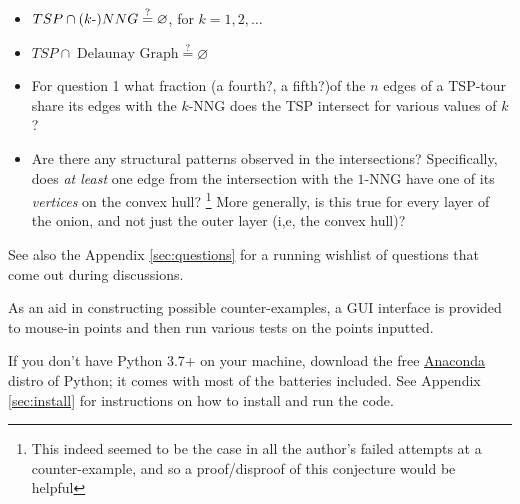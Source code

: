 \begin{description}
     \begin{itemize}
     \item $TSP \cap (k{\text -})NNG \stackrel{?}{=} \varnothing$, for $k=1,2,\ldots$
     \item $TSP \cap \; \text{Delaunay Graph} \stackrel{?}{=} \varnothing$
     \item For question 1 what fraction (a fourth?, a fifth?)of the $n$ edges of a TSP-tour share its edges with the  $k$-NNG does the TSP intersect for various values of $k$? 
     \item Are there any structural patterns observed in the intersections? Specifically, does \textit{at least } 
           one edge from the intersection with the $1$-NNG have one of its \textit{vertices} on the convex hull? 
           \footnote{This indeed seemed to be the case in all the author's failed attempts at a counter-example, and so a proof/disproof of this conjecture would be helpful}
           More generally, is this true for every layer of the onion, and not just the outer layer (i,e, the convex hull)?
     \end{itemize}

     See also the Appendix \autoref{sec:questions} for a running wishlist of questions that come out during discussions. 

     As an aid in constructing possible counter-examples, a GUI interface is provided to mouse-in points and then 
     run various tests on the points inputted. 
     
     If you don't have  Python 3.7+ on your machine, download the free  \href{https://www.anaconda.com/products/individual}{Anaconda} distro of Python; 
     it comes with most of the batteries included. See Appendix \autoref{sec:install} for instructions on how to install and run the code. 

\end{description}
